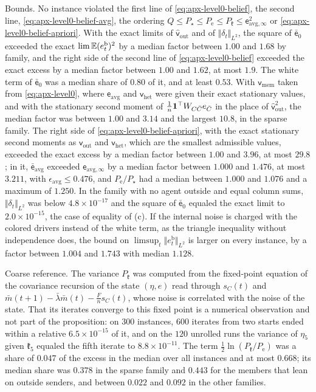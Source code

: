 \begin{numcheck}
Bounds. No instance violated the first line of \eqref{eq:apx-level0-belief}, the second line, \eqref{eq:apx-level0-belief-avg}, the ordering $Q\le P_\star\le P_{\mathrm e}\le P_{\mathfrak k}\le\mathsf e_{\mathrm{avg},\infty}^2$ or \eqref{eq:apx-level0-belief-apriori}. With the exact limits of $\hat{\mathsf v}_{\mathrm{out}}$ and of $\Vert\delta_t\Vert_{L^2}$, the square of $\bar{\mathsf e}_0$ exceeded the exact $\lim\mathbb{E}(e^{\mathrm b}_t)^2$ by a median factor between $1.00$ and $1.68$ by family, and the right side of the second line of \eqref{eq:apx-level0-belief} exceeded the exact excess by a median factor between $1.00$ and $1.62$, at most $1.9$. The white term of $\bar{\mathsf e}_0$ was a median share of $0.80$ of it, and at least $0.53$. With $\mathsf v_{\mathrm{mem}}$ taken from \eqref{eq:apx-level0}, where $\mathsf e_{\mathrm{avg}}$ and $\mathsf v_{\mathrm{het}}$ were given their exact stationary values, and with the stationary second moment of $\frac1n\mathbf{1}^\top W_{C\bar C}e_{\bar C}$ in the place of $\hat{\mathsf v}_{\mathrm{out}}^2$, the median factor was between $1.00$ and $3.14$ and the largest $10.8$, in the sparse family. The right side of \eqref{eq:apx-level0-belief-apriori}, with the exact stationary second moments as $\mathsf v_{\mathrm{out}}$ and $\mathsf v_{\mathrm{het}}$, which are the smallest admissible values, exceeded the exact excess by a median factor between $1.00$ and $3.96$, at most $29.8$; in it, $\bar{\mathsf e}_{\mathrm{avg}}$ exceeded $\mathsf e_{\mathrm{avg},\infty}$ by a median factor between $1.000$ and $1.476$, at most $3.211$, with $\epsilon_{\mathrm{avg}}\le0.476$, and $P_{\mathrm e}/P_\star$ had a median between $1.000$ and $1.076$ and a maximum of $1.250$. In the family with no agent outside and equal column sums, $\Vert\delta_t\Vert_{L^2}$ was below $4.8\times10^{-17}$ and the square of $\bar{\mathsf e}_0$ equaled the exact limit to $2.0\times10^{-15}$, the case of equality of (c). If the internal noise is charged with the colored drivers instead of the white term, as the triangle inequality without independence does, the bound on $\limsup_t\Vert e^{\mathrm b}_t\Vert_{L^2}$ is larger on every instance, by a factor between $1.004$ and $1.743$ with median $1.128$.

Coarse reference. The variance $P_{\mathfrak k}$ was computed from the fixed-point equation of the covariance recursion of the state $(\eta,e)$ read through $s_C(t)$ and $\bar m(t+1)-\bar\lambda\bar m(t)-\frac Fns_C(t)$, whose noise is correlated with the noise of the state. That its iterates converge to this fixed point is a numerical observation and not part of the proposition: on $300$ instances, $600$ iterates from two starts ended within a relative $6.5\times10^{-15}$ of it, and on the $120$ unrolled runs the variance of $\eta_5$ given $\mathfrak k_5$ equaled the fifth iterate to $8.8\times10^{-11}$. The term $\frac12\ln(P_{\mathfrak k}/P_{\mathrm e})$ was a share of $0.047$ of the excess in the median over all instances and at most $0.668$; its median share was $0.378$ in the sparse family and $0.443$ for the members that lean on outside senders, and between $0.022$ and $0.092$ in the other families.


\end{numcheck}
